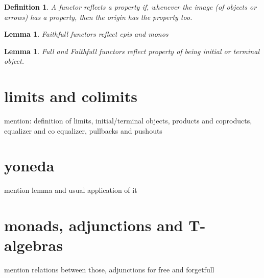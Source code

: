 \documentclass{article}
\newtheorem{lemma}[theorem]{Lemma}
\newtheorem{definition}[theorem]{Definition}
\begin{document}
\begin{definition}
	A functor \emph{reflects} a property if, whenever the image (of objects or arrows) has a property, then the origin has the property too.
\end{definition}

\begin{lemma}
	Faithfull functors reflect epis and monos
\end{lemma}

\begin{lemma}
	Full and Faithfull functors reflect property of being initial or terminal object.
\end{lemma}




\section{limits and colimits}
mention: definition of limits, initial/terminal objects, products and coproducts, equalizer and co equalizer, pullbacks and pushouts

\section{yoneda}
mention lemma and usual application of it

\section{monads, adjunctions and T-algebras}
mention relations between those, adjunctions for free and forgetfull 

\end{document}
